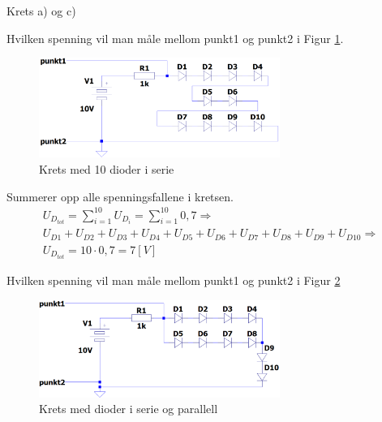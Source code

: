 \vspace{0.5cm} %

\begin{solution}[name=Løsningsforslag oppgave]
	Krets a) og c)
\end{solution}
\vspace{0.5cm} %

\begin{question}[name=Oppgave, topic=dioder]
Hvilken spenning vil man måle mellom punkt1 og punkt2 i Figur \ref{fig:10Dserie}.

	\begin{figure}[H]
		\centering
		\includegraphics[width=0.7\textwidth]{diode/figurer/10SerieD.png}
		\caption{Krets med 10 dioder i serie}
		\label{fig:10Dserie}
	\end{figure}

\end{question}

\vspace{0.5cm} %

\begin{solution}[name=Løsningsforslag oppgave]
	Summerer opp alle spenningsfallene i kretsen.
	\begin{multline*}
	U_{D_{tot}}=\sum_{i=1}^{10} U_{D_i}=\sum_{i=1}^{10} 0,7 \Rightarrow \\	U_{D1}+U_{D2}+U_{D3}+U_{D4}+U_{D5}+U_{D6}+U_{D7}+U_{D8}+U_{D9}+U_{D10} \Rightarrow \\ U_{D_{tot}}=10\cdot0,7=7 [V]
	\end{multline*}
\end{solution}

\vspace{0.5cm} %


\begin{question}[name=Oppgave, topic=dioder]
Hvilken spenning vil man måle mellom punkt1 og punkt2 i Figur \ref{fig:DserieParaMix}
	
	\begin{figure}[H]
	\centering
	\includegraphics[width=0.7\textwidth]{diode/figurer/6serieOgParaD.png}
	\caption{Krets med dioder i serie og parallell}
	\label{fig:DserieParaMix}
	\end{figure}
	
	
\end{question}

